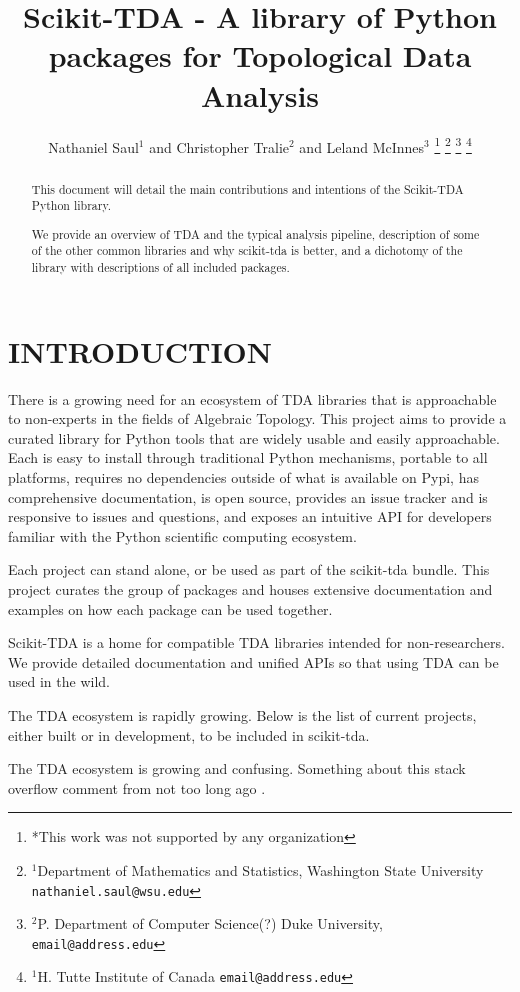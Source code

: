 \documentclass[letterpaper, 10 pt, conference]{ieeeconf}  %
\title{\LARGE \bf
Scikit-TDA - A library of Python packages for Topological Data Analysis
}
\author{Nathaniel Saul$^{1}$ and Christopher Tralie$^{2}$ and Leland McInnes$^{3}$%
\thanks{*This work was not supported by any organization}%
\thanks{$^{1}$Department of Mathematics and Statistics,
        Washington State University
        {\tt\small nathaniel.saul@wsu.edu}}%
\thanks{$^{2}$P. Department of Computer Science(?)
        Duke University,
        {\tt\small email@address.edu}}%
\thanks{$^{1}$H. Tutte Institute of Canada
        {\tt\small email@address.edu}}%
}
\begin{document}
\maketitle
\thispagestyle{empty}
\pagestyle{empty}

\begin{abstract}

This document will detail the main contributions and intentions of the Scikit-TDA Python library.

We provide an overview of TDA and the typical analysis pipeline,
description of some of the other common libraries and why scikit-tda is better, and a dichotomy of the library with descriptions of all included packages.

\end{abstract}


\tableofcontents
\section{INTRODUCTION}

There is a growing need for an ecosystem of TDA libraries that is approachable to non-experts in the fields of Algebraic Topology. 
This project aims to provide a curated library for Python tools that are widely usable and easily approachable. 
Each is easy to install through traditional Python mechanisms, portable to all platforms, requires no dependencies outside of what is available on Pypi, has comprehensive documentation, is open source, provides an issue tracker and is responsive to issues and questions, and exposes an intuitive API for developers familiar with the Python scientific computing ecosystem.

Each project can stand alone, or be used as part of the scikit-tda bundle. This project curates the group of packages and houses extensive documentation and examples on how each package can be used together.

Scikit-TDA is a home for compatible TDA libraries intended for non-researchers. We provide detailed documentation and unified APIs so that using TDA can be used in the wild.

The TDA ecosystem is rapidly growing. Below is the list of current projects, either built or in development, to be included in scikit-tda.




The TDA ecosystem is growing and confusing. Something about this stack overflow comment from not too long ago \cite{overflowPiyush}.
\end{document}
